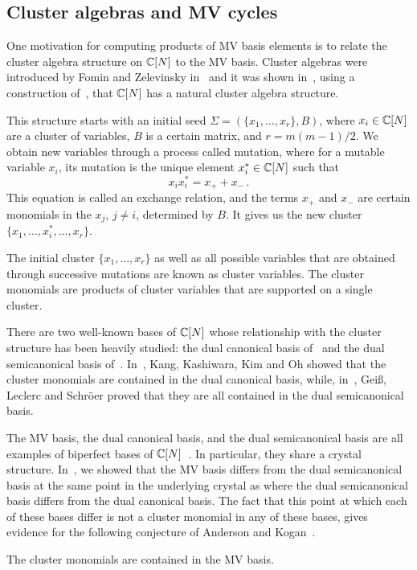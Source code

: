 \documentclass{article}
\begin{document}
\subsection{Cluster algebras and MV cycles}\label{ss:clmv}
% 
One motivation for computing products of MV basis elements is to relate the cluster algebra structure on \(\mathbb C[N]\) to the MV basis. Cluster algebras were introduced by Fomin and Zelevinsky in~\cite{fomin2002cluster1} and it was shown in~\cite{geiss2007initial}, using a construction of~\cite{berenstein2005cluster3}, that \(\mathbb C[N]\) has a natural cluster algebra structure. 

This structure starts with an initial seed \(\Sigma = (\{x_1,\dots,x_r\},B)\), where \(x_i \in \mathbb C[N]\) are a cluster of variables, \(B\) is a certain matrix, and \( r = m(m-1)/2 \).
We obtain new variables through a process called mutation, where for a mutable variable \(x_i\), its mutation is the unique element \(x_i^* \in \mathbb C[N]\) such that 
\[
    x_i x_i^* = x_+ + x_- \,.
\]
This equation is called an exchange relation, and the terms \(x_+\) and \(x_-\) are certain monomials in the \(x_j\), \(j\neq i\),  determined by \(B\). 
It gives us the new cluster \(\{x_1, \dots, x_i^*, \dots, x_r\}\). 

The initial cluster \(\{x_1,\dots,x_r\}\) as well as all possible variables that are obtained through successive mutations are known as cluster variables. 
The cluster monomials are products of cluster variables that are supported on a single cluster. 

There are two well-known bases of \(\mathbb C[N]\) whose relationship with the cluster structure has been heavily studied: the dual canonical basis of~\cite{lusztig1990canonicalbases} and the dual semicanonical basis of~\cite{lusztig2000semicanonical}.
In~\cite{kang2018monoidal}, Kang, Kashiwara, Kim and Oh showed that the cluster monomials are contained in the dual canonical basis, while, in~\cite{geiss2006rigid}, Gei\ss, Leclerc and Schr\"oer proved that they are all contained in the dual semicanonical basis.
%  

The MV basis, the dual canonical basis, and the dual semicanonical basis are all examples of biperfect bases of \(\mathbb C[N]\)~\cite[Section 2]{baumann2019mirkovic}. In particular, they share a crystal structure.
In~\cite[Appendix]{baumann2019mirkovic}, we showed that the MV basis differs from the dual semicanonical basis at the same point in the underlying crystal as where the dual semicanonical basis differs from the dual canonical basis.  
% 
The fact that this point at which each of these bases differ is not a cluster monomial in any of these bases, gives evidence for the following conjecture of Anderson and Kogan~\cite[Conjecture 5.1]{anderson2006algebra}.
\begin{conjecture}\label{conj:cluster in MV}
    The cluster monomials are contained in the MV basis. 
\end{conjecture}
\end{document}
